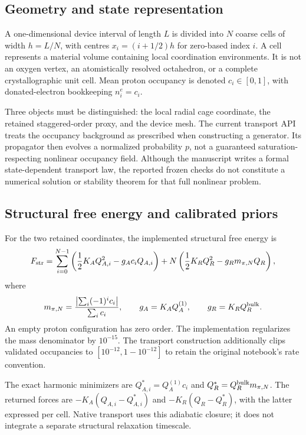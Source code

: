 \documentclass[11pt,a4paper]{article}
\begin{document}
\subsection{Geometry and state representation}

A one-dimensional device interval of length $L$ is divided into $N$ coarse cells of width $h=L/N$, with centres $x_i=(i+1/2)h$ for zero-based index $i$. A cell represents a material volume containing local coordination environments. It is not an oxygen vertex, an atomistically resolved octahedron, or a complete crystallographic unit cell. Mean proton occupancy is denoted $c_i\in[0,1]$, with donated-electron bookkeeping $n_i^e=c_i$.

Three objects must be distinguished: the local radial cage coordinate, the retained staggered-order proxy, and the device mesh. The current transport API treats the occupancy background as prescribed when constructing a generator. Its propagator then evolves a normalized probability $p$, not a guaranteed saturation-respecting nonlinear occupancy field. Although the manuscript writes a formal state-dependent transport law, the reported frozen checks do not constitute a numerical solution or stability theorem for that full nonlinear problem.

\subsection{Structural free energy and calibrated priors}

For the two retained coordinates, the implemented structural free energy is
\begin{equation}
 F_{\rm str}=\sum_{i=0}^{N-1}\left(\frac12K_A Q_{A,i}^2-g_A c_iQ_{A,i}\right)
 +N\left(\frac12K_RQ_R^2-g_Rm_{\pi,N}Q_R\right),
 \label{eq:energy}
\end{equation}
where
\begin{equation}
 m_{\pi,N}=\frac{\left|\sum_i(-1)^ic_i\right|}{\sum_i c_i},\qquad
 g_A=K_AQ_A^{(1)},\qquad g_R=K_RQ_R^{\rm bulk}.
\end{equation}
An empty proton configuration has zero order. The implementation regularizes the mass denominator by $10^{-15}$. The transport construction additionally clips validated occupancies to $[10^{-12},1-10^{-12}]$ to retain the original notebook's rate convention.

The exact harmonic minimizers are $Q_{A,i}^*=Q_A^{(1)}c_i$ and $Q_R^*=Q_R^{\rm bulk}m_{\pi,N}$. The returned forces are $-K_A(Q_{A,i}-Q_{A,i}^*)$ and $-K_R(Q_R-Q_R^*)$, with the latter expressed per cell. Native transport uses this adiabatic closure; it does not integrate a separate structural relaxation timescale.
\end{document}
